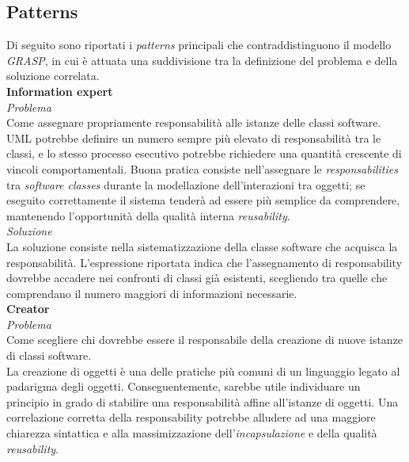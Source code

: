 \documentclass{article}
\begin{document}
\subsection*{Patterns}
\large
Di seguito sono riportati i \textit{patterns} principali che contraddistinguono il modello \textit{GRASP}, in cui è attuata una suddivisione tra la definizione del problema e della soluzione correlata.\vspace*{14pt}\\
\textbf{Information expert}\vspace*{7pt}\\
\textit{Problema}\\
Come assegnare propriamente responsabilità alle istanze delle classi software.\vspace*{7pt}\\
UML potrebbe definire un numero sempre più elevato di responsabilità tra le classi, e lo stesso processo esecutivo potrebbe richiedere una quantità crescente di vincoli comportamentali. Buona pratica consiste nell'assegnare le \textit{responsabilities} tra \textit{software classes} durante la modellazione dell'interazioni tra oggetti; se eseguito correttamente il sistema tenderà ad essere più semplice da comprendere, mantenendo l'opportunità della qualità interna \textit{reusability}.\vspace*{14pt}\\ 
\textit{Soluzione}\\
La soluzione consiste nella sistematizzazione della classe software che acquisca la responsabilità. L'espressione riportata indica che l'assegnamento di responsability dovrebbe accadere nei confronti di classi già esistenti, scegliendo tra quelle che comprendano il numero maggiori di informazioni necessarie.\vspace*{14pt}\\
\textbf{Creator}\vspace*{7pt}\\
\textit{Problema}\\
Come scegliere chi dovrebbe essere il responsabile della creazione di nuove istanze di classi software.\vspace*{7pt}\\
La creazione di oggetti è una delle pratiche più comuni di un linguaggio legato al padarigma degli oggetti. Conseguentemente, sarebbe utile individuare un principio in grado di stabilire una responsabilità affine all'istanze di oggetti. Una correlazione corretta della responsability potrebbe alludere ad una maggiore chiarezza sintattica e alla massimizzazione dell'\textit{incapsulazione} e della qualità \textit{reusability}.\vspace*{14pt}\\
\end{document}
